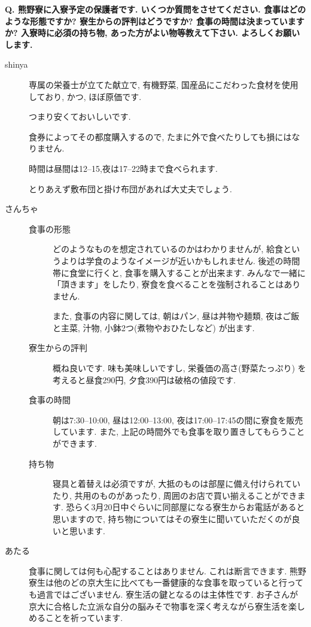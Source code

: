 \documentclass[10pt,b5jsbook,dvips,dvipdfmx,openany]{jsbook}
\theoremstyle{definition}
\begin{document}
		\begin{tcolorbox}
		\textbf{Q. 熊野寮に入寮予定の保護者です. いくつか質問をさせてください.
		食事はどのような形態ですか? 寮生からの評判はどうですか? 食事の時間は決まっていますか? 入寮時に必須の持ち物, あった方がよい物等教えて下さい. よろしくお願いします. }
		\end{tcolorbox}
		\begin{description}
		\item[shinya]
		専属の栄養士が立てた献立で, 有機野菜, 国産品にこだわった食材を使用しており, かつ, ほぼ原価です.

		つまり安くておいしいです.

		食券によってその都度購入するので, たまに外で食べたりしても損にはなりません.

		時間は昼間は12--15,夜は17--22時まで食べられます.

		とりあえず敷布団と掛け布団があれば大丈夫でしょう.

		\item[さんちゃ]
			\begin{description}
			\item[食事の形態]
			どのようなものを想定されているのかはわかりませんが, 給食というよりは学食のようなイメージが近いかもしれません. 後述の時間帯に食堂に行くと, 食事を購入することが出来ます. 	みんなで一緒に「頂きます」をしたり, 寮食を食べることを強制されることはありません.

		また, 食事の内容に関しては, 朝はパン, 昼は丼物や麺類, 夜はご飯と主菜, 汁物, 小鉢2つ(煮物やおひたしなど) が出ます.

			\item[寮生からの評判] 概ね良いです. 味も美味しいですし, 栄養価の高さ(野菜たっぷり) を考えると昼食290円, 夕食390円は破格の値段です.

			\item[食事の時間] 朝は7:30--10:00, 昼は12:00--13:00, 夜は17:00--17:45の間に寮食を販売しています. また, 上記の時間外でも食事を取り置きしてもらうことができます.

			\item[持ち物]寝具と着替えは必須ですが, 大抵のものは部屋に備え付けられていたり, 共用のものがあったり, 周囲のお店で買い揃えることができます. 恐らく3月20日中ぐらいに同部屋になる寮生からお電話があると思いますので, 持ち物についてはその寮生に聞いていただくのが良いと思います.
			\end{description}

		\item[あたる]
		食事に関しては何も心配することはありません. これは断言できます. 熊野寮生は他のどの京大生に比べても一番健康的な食事を取っていると行っても過言ではございません. 寮生活の鍵となるのは主体性です. お子さんが京大に合格した立派な自分の脳みそで物事を深く考えながら寮生活を楽しめることを祈っています.
		\end{description}
\end{document}
